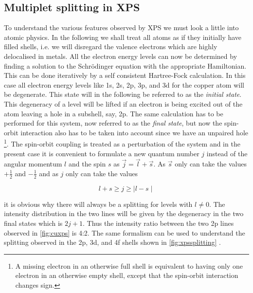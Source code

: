\subsection{Multiplet splitting in XPS}
To understand the various features observed by XPS we must look a little into atomic physics. In the following we shall treat all atoms as if they initially have filled shells, i.e. we will disregard the valence electrons which are highly delocalised in metals. All the electron energy levels can now be determined by finding a solution to the Schr\"{o}dinger equation with the appropriate Hamiltonian. This can be done iteratively by a self consistent Hartree-Fock calculation. In this case all electron energy levels like 1s, 2s, 2p, 3p, and 3d for the copper atom will be degenerate. This state will in the following be referred to as the {\em initial state}. This degeneracy of a level will be lifted if an electron is being excited out of the atom leaving a hole in a subshell, say, 2p. The same calculation has to be performed for this system, now referred to as the {\em final state}, but now the spin-orbit interaction also has to be taken into account since we have an unpaired hole \footnote{A missing electron in an otherwise full shell is equivalent to having only one electron in an otherwise empty shell, except that the spin-orbit interaction changes sign.}. The spin-orbit coupling is treated as a perturbation of the system and in the present case it is convenient to formulate a new quantum number $j$ instead of the angular momentum $l$ and the spin $s$ as $\vec{j}=\vec{l}+\vec{s}$. As $\vec{s}$ only can take the values $+\frac{1}{2}$ and $-\frac{1}{2}$ and as $j$ only can take the values

\begin{equation}
l+s \geq j \geq \mid l-s \mid
\end{equation}

\noindent it is obvious why there will always be a splitting for levels with $l\neq 0$. The intensity distribution in the two lines will be given by the degeneracy in the two final states which is $2j+1$.  Thus  the intensity ratio between the two 2p lines observed in \autoref{fig:cuxps} is 4:2. The same formalism can be used to understand the splitting observed in the 2p, 3d, and  4f shells shown in \autoref{fig:xpssplitting} \cite{siegbahn1}.

